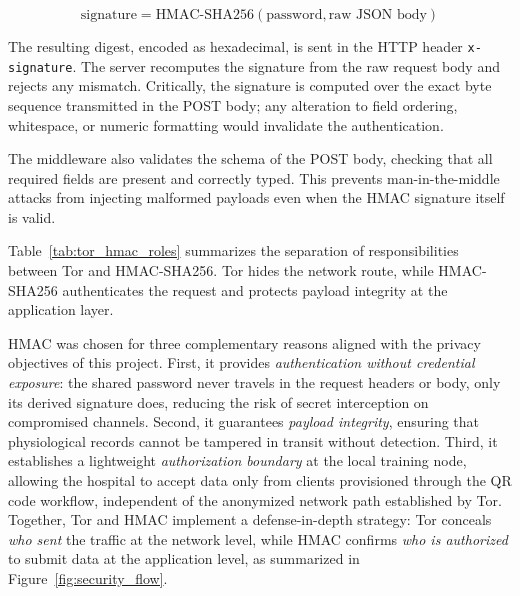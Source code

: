 \documentclass[12pt]{article}
\begin{document}
\begin{equation}
\text{signature} = \text{HMAC-SHA256}(\text{password}, \text{raw JSON body})
\end{equation}

The resulting digest, encoded as hexadecimal, is sent in the HTTP header \texttt{x-signature}. The server recomputes the signature from the raw request body and rejects any mismatch. Critically, the signature is computed over the exact byte sequence transmitted in the POST body; any alteration to field ordering, whitespace, or numeric formatting would invalidate the authentication.

The middleware also validates the schema of the POST body, checking that all required fields are present and correctly typed. This prevents man-in-the-middle attacks from injecting malformed payloads even when the HMAC signature itself is valid.

Table~\ref{tab:tor_hmac_roles} summarizes the separation of responsibilities between Tor and HMAC-SHA256. Tor hides the network route, while HMAC-SHA256 authenticates the request and protects payload integrity at the application layer.

\begin{table}[htbp]
\centering
\caption{Separation of responsibilities between Tor and HMAC-SHA256.}
\label{tab:tor_hmac_roles}
\end{table}

HMAC was chosen for three complementary reasons aligned with the privacy objectives of this project. First, it provides \textit{authentication without credential exposure}: the shared password never travels in the request headers or body, only its derived signature does, reducing the risk of secret interception on compromised channels. Second, it guarantees \textit{payload integrity}, ensuring that physiological records cannot be tampered in transit without detection. Third, it establishes a lightweight \textit{authorization boundary} at the local training node, allowing the hospital to accept data only from clients provisioned through the QR code workflow, independent of the anonymized network path established by Tor. Together, Tor and HMAC implement a defense-in-depth strategy: Tor conceals \textit{who sent} the traffic at the network level, while HMAC confirms \textit{who is authorized} to submit data at the application level, as summarized in Figure~\ref{fig:security_flow}.
\end{document}
